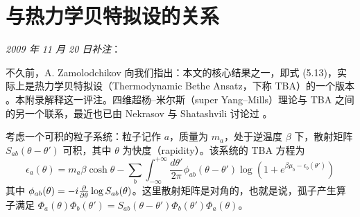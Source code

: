 \section{与热力学贝特拟设的关系}
\label{app:TBA}

{\itshape 2009 年 11 月 20 日补注}：

不久前，A. Zamolodchikov 向我们指出：本文的核心结果之一，即式 (5.13)，实际上是热力学贝特拟设（Thermodynamic Bethe Ansatz，下称 TBA）的一个版本 \cite{Zamolodchikov:1989cf}。本附录解释这一评注。四维超杨--米尔斯（super Yang--Mills）理论与 TBA 之间的另一个联系，最近也已由 Nekrasov 与 Shatashvili 讨论过 \cite{Nekrasov:2009ui}。%

考虑一个可积的粒子系统：粒子记作 $a$，质量为 $m_a$，处于逆温度 $\beta$ 下，散射矩阵 $S_{ab}(\theta-\theta')$ 可积，其中 $\theta$ 为快度（rapidity）。该系统的 TBA 方程为
%
\begin{equation}\label{eq:gen-TBA}
\epsilon_a(\theta) = m_a \beta \cosh \theta - \sum_b
\int_{-\infty}^{+\infty} \frac{d \theta'}{2\pi}
\phi_{ab}(\theta-\theta') \log (1 + e^{\beta \mu_b -
\epsilon_b(\theta')})
\end{equation}
%
其中 $\phi_{ab}(\theta) = - i\frac{\partial}{\partial \theta} \log
S_{ab}(\theta)$。这里散射矩阵是对角的，也就是说，孤子产生算子满足 $\Phi_a(\theta) \Phi_b(\theta') =
S_{ab}(\theta-\theta') \Phi_b(\theta') \Phi_a(\theta)$。

